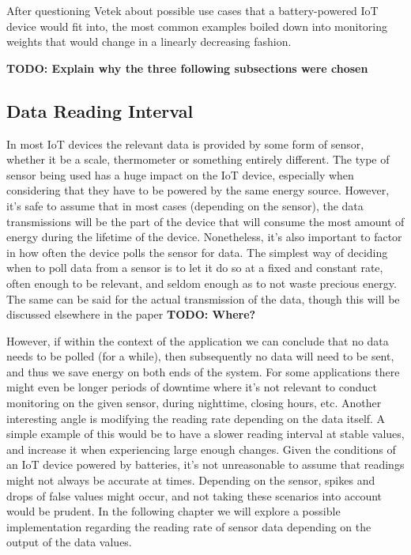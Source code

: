 After questioning Vetek about possible use cases that a battery-powered IoT device would fit into, the most common examples boiled down into monitoring weights that would change in a linearly decreasing fashion. 

\textbf{TODO: Explain why the three following subsections were chosen}

\subsection{Data Reading Interval}
In most IoT devices the relevant data is provided by some form of sensor, whether it be a scale, thermometer or something entirely different. The type of sensor being used has a huge impact on the IoT device, especially when considering that they have to be powered by the same energy source. However, it's safe to assume that in most cases (depending on the sensor), the data transmissions will be the part of the device that will consume the most amount of energy during the lifetime of the device. Nonetheless, it's also important to factor in how often the device polls the sensor for data. The simplest way of deciding when to poll data from a sensor is to let it do so at a fixed and constant rate, often enough to be relevant, and seldom enough as to not waste precious energy. The same can be said for the actual transmission of the data, though this will be discussed elsewhere in the paper \textbf{TODO: Where?}

However, if within the context of the application we can conclude that no data needs to be polled (for a while), then subsequently no data will need to be sent, and thus we save energy on both ends of the system. For some applications there might even be longer periods of downtime where it's not relevant to conduct monitoring on the given sensor, \eg during nighttime, closing hours, etc. Another interesting angle is modifying the reading rate depending on the data itself. A simple example of this would be to have a slower reading interval at stable values, and increase it when experiencing large enough changes. Given the conditions of an IoT device powered by batteries, it's not unreasonable to assume that readings might not always be accurate at times. Depending on the sensor, spikes and drops of false values might occur, and not taking these scenarios into account would be prudent. In the following chapter we will explore a possible implementation regarding the reading rate of sensor data depending on the output of the data values.

